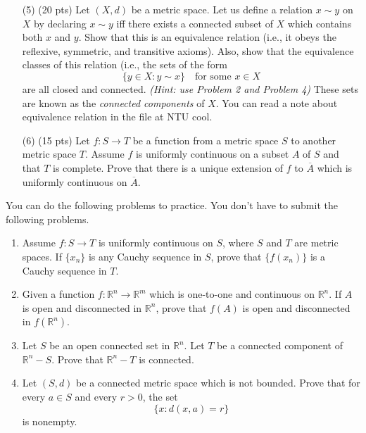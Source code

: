 \documentclass[12pt]{amsart}
\theoremstyle{definition}
\theoremstyle{remark}
\begin{document}
\begin{CJK}{UTF8}{bkai}
\begin{enumerate}
\vfill
\bigskip

\item[(5)] (20 pts)
 Let $(X,d)$ be a metric space. Let us define a relation $x \sim y$ on $X$ by declaring  
$x \sim y$ iff there exists a connected subset of $X$ which contains both $x$ and $y$.  
Show that this is an equivalence relation (i.e., it obeys the reflexive, symmetric, and transitive axioms).  
Also, show that the equivalence classes of this relation (i.e., the sets of the form  
\[
\{ y \in X : y \sim x \} \quad \text{for some } x \in X
\]  
are all closed and connected.  
\emph{(Hint: use Problem 2 and Problem 4)}  
These sets are known as the \emph{connected components} of $X$.
You can read a note about equivalence relation in the file at NTU cool.

\bigskip
\vfill

\item[(6)]  (15 pts) 
 Let $f : S \to T$ be a function from a metric space $S$ to another metric space $T$.  
Assume $f$ is uniformly continuous on a subset $A$ of $S$ and that $T$ is complete.  
Prove that there is a unique extension of $f$ to $\overline{A}$ which is uniformly continuous on $\overline{A}$.


\end{enumerate}

You can do the following problems to practice. You don't have to submit the following problems.

\begin{enumerate}

\item  Assume $f : S \to T$ is uniformly continuous on $S$, where $S$ and $T$ are metric spaces.  
If $\{x_n\}$ is any Cauchy sequence in $S$, prove that $\{f(x_n)\}$ is a Cauchy sequence in $T$. 

\medskip

\item Given a function $f : \mathbb{R}^n \to \mathbb{R}^m$ which is one-to-one and continuous on $\mathbb{R}^n$.  
If $A$ is open and disconnected in $\mathbb{R}^n$, prove that $f(A)$ is open and disconnected in $f(\mathbb{R}^n)$.

\medskip

\item Let $S$ be an open connected set in $\mathbb{R}^n$.  
Let $T$ be a connected component of $\mathbb{R}^n - S$.  
Prove that $\mathbb{R}^n - T$ is connected. 

\medskip

\item  \; Let $(S,d)$ be a connected metric space which is not bounded.  
Prove that for every $a \in S$ and every $r > 0$, the set 
\[
\{x : d(x,a) = r\}
\]
is nonempty.

\end{enumerate}

\end{CJK}
\end{document}
